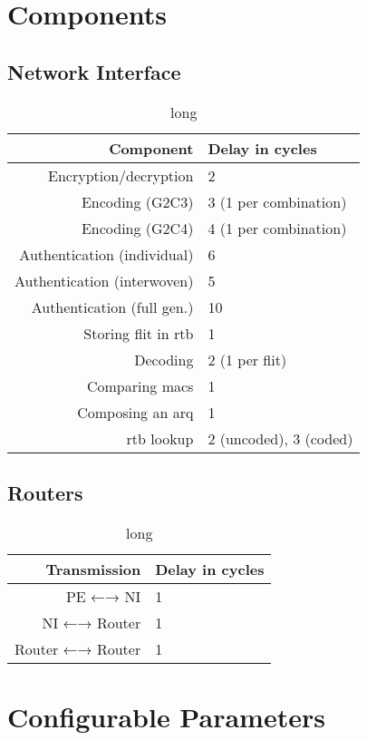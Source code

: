 \section{Components}
\subsection{Network Interface}

\begin{table}
    \centering
    \begin{tabulary}{\textwidth}{R|L}
        Component & Delay in cycles \\\hline
        Encryption/decryption & 2 \\
        Encoding (G2C3) & 3 (1 per combination) \\
        Encoding (G2C4) & 4 (1 per combination) \\
        Authentication (individual) & 6 \\
        Authentication (interwoven) & 5 \\
        Authentication (full gen.) & 10 \\
        Storing flit in \gls{rtb} & 1 \\
        Decoding & 2 (1 per flit) \\
        Comparing \glspl{mac} & 1 \\
        Composing an \gls{arq} & 1 \\
        \Gls{rtb} lookup & 2 (uncoded), 3 (coded)
    \end{tabulary}
    \caption[short]{long}
    \label{tab:processinglatencies}
\end{table}

\subsection{Routers}

\begin{table}
    \centering
    \begin{tabulary}{\textwidth}{R|L}
        Transmission & Delay in cycles \\\hline
        PE ←→ NI & 1 \\
        NI ←→ Router & 1 \\
        Router ←→ Router & 1
    \end{tabulary}
    \caption[short]{long}
    \label{tab:transmissionlatencies}
\end{table}

\section{Configurable Parameters}
